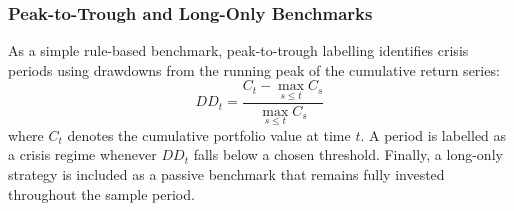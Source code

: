 \documentclass[11pt, a4paper]{article}
\begin{document}
\subsubsection{Peak-to-Trough and Long-Only Benchmarks}
As a simple rule-based benchmark, peak-to-trough labelling identifies crisis periods using drawdowns from the running peak of the cumulative return series:
\begin{equation}
\label{eq:drawdown}
DD_t = \frac{C_t - \max_{s \leq t} C_s}{\max_{s \leq t} C_s}
\end{equation}
where $C_t$ denotes the cumulative portfolio value at time $t$. A period is labelled as a crisis regime whenever $DD_t$ falls below a chosen threshold. Finally, a long-only strategy is included as a passive benchmark that remains fully invested throughout the sample period.
\end{document}
